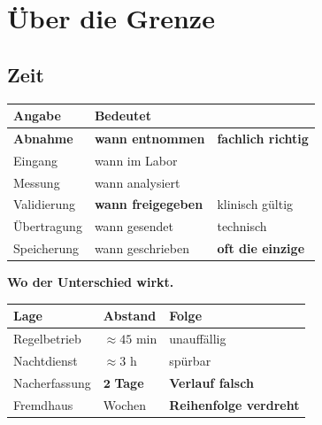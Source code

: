 \part{Über die Grenze}

\chapter{Zeit}\label{kap:zeit}

\begin{merksatz}
\begin{center}
{\small
\renewcommand{\arraystretch}{1.5}
\begin{tabular}{@{}P{3.0cm}P{2.8cm}P{2.2cm}@{}}
\toprule
\textbf{Angabe} & \textbf{Bedeutet} & \\
\midrule
\textbf{Abnahme} & \textbf{wann entnommen} & \textcolor{gruen}{\textbf{fachlich richtig}}\\
Eingang & wann im Labor & \\
Messung & wann analysiert & \\
Validierung & \textbf{wann freigegeben} & \textcolor{gruen}{klinisch gültig}\\
Übertragung & wann gesendet & \textcolor{akzent}{technisch}\\
Speicherung & wann geschrieben & \textcolor{akzent}{\textbf{oft die einzige}}\\
\bottomrule
\end{tabular}}
\end{center}

\begin{center}
\begin{minipage}{0.88\textwidth}
\end{minipage}
\end{center}

\textbf{Wo der Unterschied wirkt.}

\begin{center}
{\small
\renewcommand{\arraystretch}{1.45}
\begin{tabular}{@{}P{3.0cm}P{2.4cm}P{2.6cm}@{}}
\toprule
\textbf{Lage} & \textbf{Abstand} & \textbf{Folge}\\
\midrule
Regelbetrieb & $\approx45$ min & \textcolor{gruen}{unauffällig}\\
Nachtdienst & $\approx3$ h & \textcolor{mittel}{spürbar}\\
Nacherfassung & \textcolor{akzent}{$\mathbf{2}$ \textbf{Tage}} & \textcolor{akzent}{\textbf{Verlauf falsch}}\\
Fremdhaus & \textcolor{akzent}{Wochen} & \textcolor{akzent}{\textbf{Reihenfolge verdreht}}\\
\bottomrule
\end{tabular}}
\end{center}


\end{merksatz}
